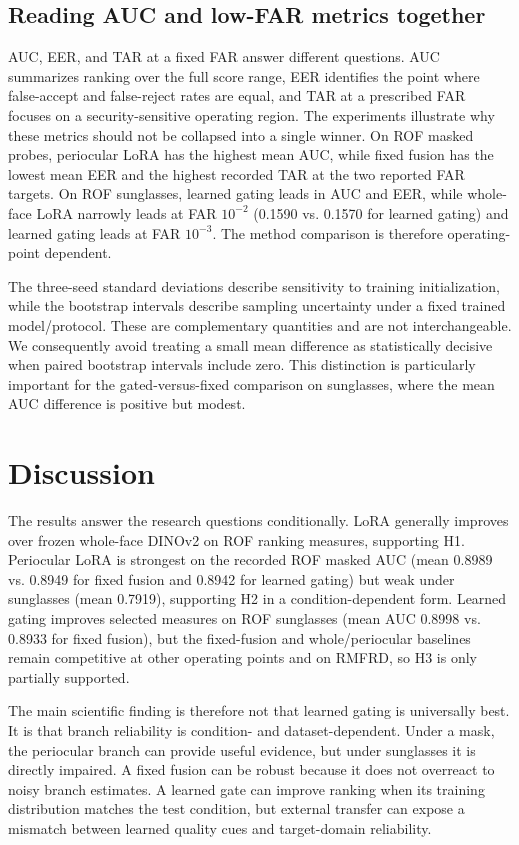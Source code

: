 \documentclass[10pt,journal,compsoc]{IEEEtran}
\begin{document}
\subsection{Reading AUC and low-FAR metrics together}
AUC, EER, and TAR at a fixed FAR answer different questions. AUC summarizes ranking over the full score range, EER identifies the point where false-accept and false-reject rates are equal, and TAR at a prescribed FAR focuses on a security-sensitive operating region. The experiments illustrate why these metrics should not be collapsed into a single winner. On ROF masked probes, periocular LoRA has the highest mean AUC, while fixed fusion has the lowest mean EER and the highest recorded TAR at the two reported FAR targets. On ROF sunglasses, learned gating leads in AUC and EER, while whole-face LoRA narrowly leads at FAR $10^{-2}$ (0.1590 vs. 0.1570 for learned gating) and learned gating leads at FAR $10^{-3}$. The method comparison is therefore operating-point dependent.

The three-seed standard deviations describe sensitivity to training initialization, while the bootstrap intervals describe sampling uncertainty under a fixed trained model/protocol. These are complementary quantities and are not interchangeable. We consequently avoid treating a small mean difference as statistically decisive when paired bootstrap intervals include zero. This distinction is particularly important for the gated-versus-fixed comparison on sunglasses, where the mean AUC difference is positive but modest.

\section{Discussion}
The results answer the research questions conditionally. LoRA generally improves over frozen whole-face DINOv2 on ROF ranking measures, supporting H1. Periocular LoRA is strongest on the recorded ROF masked AUC (mean 0.8989 vs. 0.8949 for fixed fusion and 0.8942 for learned gating) but weak under sunglasses (mean 0.7919), supporting H2 in a condition-dependent form. Learned gating improves selected measures on ROF sunglasses (mean AUC 0.8998 vs. 0.8933 for fixed fusion), but the fixed-fusion and whole/periocular baselines remain competitive at other operating points and on RMFRD, so H3 is only partially supported.

The main scientific finding is therefore not that learned gating is universally best. It is that branch reliability is condition- and dataset-dependent. Under a mask, the periocular branch can provide useful evidence, but under sunglasses it is directly impaired. A fixed fusion can be robust because it does not overreact to noisy branch estimates. A learned gate can improve ranking when its training distribution matches the test condition, but external transfer can expose a mismatch between learned quality cues and target-domain reliability.
\end{document}
